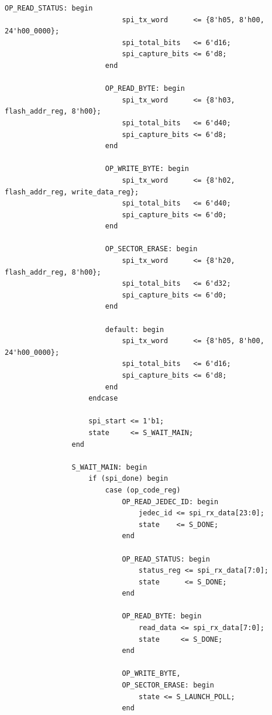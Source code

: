 \documentclass[a4paper,10pt]{article}
\begin{document}
\begin{lstlisting}[caption=w25q128_ctrl.v]
                        OP_READ_STATUS: begin
                            spi_tx_word      <= {8'h05, 8'h00, 24'h00_0000};
                            spi_total_bits   <= 6'd16;
                            spi_capture_bits <= 6'd8;
                        end

                        OP_READ_BYTE: begin
                            spi_tx_word      <= {8'h03, flash_addr_reg, 8'h00};
                            spi_total_bits   <= 6'd40;
                            spi_capture_bits <= 6'd8;
                        end

                        OP_WRITE_BYTE: begin
                            spi_tx_word      <= {8'h02, flash_addr_reg, write_data_reg};
                            spi_total_bits   <= 6'd40;
                            spi_capture_bits <= 6'd0;
                        end

                        OP_SECTOR_ERASE: begin
                            spi_tx_word      <= {8'h20, flash_addr_reg, 8'h00};
                            spi_total_bits   <= 6'd32;
                            spi_capture_bits <= 6'd0;
                        end

                        default: begin
                            spi_tx_word      <= {8'h05, 8'h00, 24'h00_0000};
                            spi_total_bits   <= 6'd16;
                            spi_capture_bits <= 6'd8;
                        end
                    endcase

                    spi_start <= 1'b1;
                    state     <= S_WAIT_MAIN;
                end

                S_WAIT_MAIN: begin
                    if (spi_done) begin
                        case (op_code_reg)
                            OP_READ_JEDEC_ID: begin
                                jedec_id <= spi_rx_data[23:0];
                                state    <= S_DONE;
                            end

                            OP_READ_STATUS: begin
                                status_reg <= spi_rx_data[7:0];
                                state      <= S_DONE;
                            end

                            OP_READ_BYTE: begin
                                read_data <= spi_rx_data[7:0];
                                state     <= S_DONE;
                            end

                            OP_WRITE_BYTE,
                            OP_SECTOR_ERASE: begin
                                state <= S_LAUNCH_POLL;
                            end


\end{lstlisting}
\end{document}
